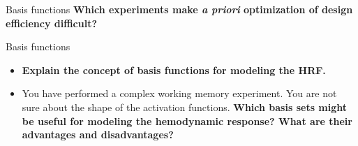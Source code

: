 \documentclass{beamer}
\begin{document}
\begin{frame}{Basis functions}
  \textbf{Which experiments make \textit{a priori} optimization of design efficiency difficult?}

\end{frame}

% 

\begin{frame}{Basis functions}
  \begin{itemize}
    \item \textbf{Explain the concept of basis functions for modeling the HRF.}


    \bigskip
    \item You have performed a complex working memory experiment. You are not sure about the shape of the activation functions. \textbf{Which basis sets might be useful for modeling the hemodynamic response? What are their advantages and disadvantages?}

  \end{itemize}  
\end{frame}
\end{document}
